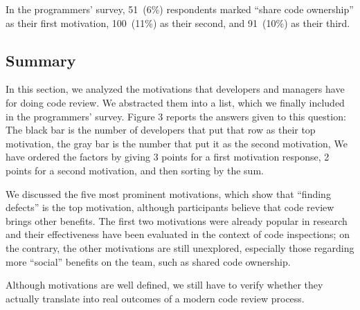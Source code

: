 In the programmers' survey, 51~(6\%) respondents marked ``share code
ownership'' as their first motivation, 100~(11\%) as their second, and 91~(10\%)
as their third.

\subsection{Summary}

In this section, we analyzed the motivations that developers and managers have
for doing code review. We abstracted them into a list, which we finally
included in the programmers' survey. Figure 3 reports the answers given to this
question: The black bar is the number of developers that put that row as their
top motivation, the gray bar is the number that put it as the second
motivation, \etc We have ordered the factors by giving 3 points for a first
motivation response, 2 points for a second motivation, \etc and then sorting by
the sum. 

We discussed the five most prominent motivations, which show that ``finding
defects'' is the top motivation, although participants believe that code review
brings other benefits. The first two motivations were already popular in
research and their effectiveness have been evaluated in the context of code
inspections; on the contrary, the other motivations are still unexplored,
especially those regarding more ``social'' benefits on the team, such as shared
code ownership.

Although motivations are well defined, we still have to verify whether they
actually translate into real outcomes of a modern code review process. 
